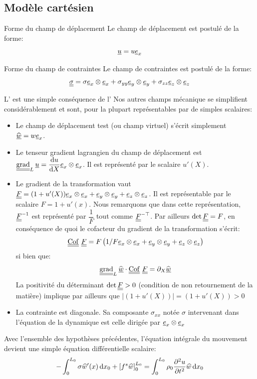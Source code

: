 \documentclass[10pt]{book}
\begin{document}
\subsection{Modèle cartésien}\label{Subsection:CartésienUD}
\begin{Hypothese}{Forme du champ de déplacement}\label{Hyp:Forme_champ_dep_1D} Le champ de déplacement est postulé de la forme: 
$$\underline{u}=u\underline{e}_{x}$$ 
\end{Hypothese}
\begin{Hypothese}{Forme du champ de contraintes}\label{Hyp:Forme_champ_contraintes_1D} Le champ de contraintes est postulé de la forme: 
$$\underline{\underline{\sigma}}=\sigma\underline{e}_{x}\otimes\underline{e}_{x}+\sigma_{yy}\underline{e}_{y}\otimes\underline{e}_{y}+\sigma_{zz}\underline{e}_{z}\otimes\underline{e}_{z}$$ 
\end{Hypothese}
L' est une simple conséquence de l' 
Nos autres champs mécanique se simplifient considérablement et sont, pour la plupart représentables par de simples scalaires:
\begin{itemize}
\item Le champ de déplacement test (ou champ virtuel) s'écrit simplement $\widehat{\underline{w}} = w\underline{e}_{x}$.
\item Le tenseur gradient lagrangien du champ de déplacement est $\tgrad_{L}\Dep=\dfrac{\d u}{\d X}\ex\otimes\ex$. Il est représenté par le scalaire $u'(X)$.
\item Le gradient de la transformation vaut $\underline{\underline{F}} = (1+u'(X))\underline{e}_{x}\otimes\underline{e}_{x}+\underline{e}_{y}\otimes\underline{e}_{y}+\underline{e}_{z}\otimes\underline{e}_{z}$. Il est représentable par le scalaire $F=1+u'(x)$. Nous remarquons que dans cette représentation, $\underline{\underline{F}}^{-1}$ est représenté par $\dfrac{1}{F}$ tout comme $\underline{\underline{F}}^{-\top}$. Par ailleurs $\det\underline{\underline{F}}=F$, en conséquence de quoi le cofacteur du gradient de la transformation s'écrit:
$$\Cof\GT = F\left(1/F\ex\otimes\ex+\ey\otimes\ey+\ez\otimes\ez\right)$$
 si bien que:
$$\tgrad_{L}\DepVirt\cdot\Cof\GT=\partial_{X}\DepVirt$$
La positivité du déterminant $\det\underline{\underline{F}}>0$ (condition de non retournement de la matière) implique par ailleurs que $|(1+u'(X))|=(1+u'(X))>0$
\item La contrainte est diagonale. Sa composante $\sigma_{xx}$ notée $\sigma$ intervenant dans l'équation de la dynamique est celle dirigée par $\underline{e}_{x}\otimes\underline{e}_{x}$
\end{itemize}
Avec l'ensemble des hypothèses précédentes, l'équation intégrale du mouvement  devient une simple équation différentielle scalaire:
\begin{equation}
-\int_{0}^{L_{0}}\sigma\widehat{w}'(x)\,\mathrm{d}x_{0}+\left[f^{s}\widehat{w}\right]_{0}^{L_{0}}=\int_{0}^{L_{0}}\rho_{0}\dfrac{\partial^{2}u}{\partial t^{2}}\widehat{w}\,\mathrm{d}x_{0}
\label{eq:forme_faible_cartesianUD}
\end{equation}
\end{document}
